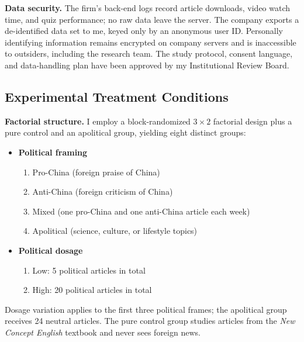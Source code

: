 \documentclass[12pt, american]{article}
\begin{document}
\textbf{Data security.}
The firm’s back-end logs record article downloads, video watch time, and quiz performance; no raw data leave the server.  The company exports a de-identified data set to me, keyed only by an anonymous user ID.  Personally identifying information remains encrypted on company servers and is inaccessible to outsiders, including the research team.  The study protocol, consent language, and data-handling plan have been approved by my Institutional Review Board.

\subsection{Experimental Treatment Conditions}

\textbf{Factorial structure.}
I employ a block-randomized $3 \times 2$ factorial design plus a pure control and an apolitical group, yielding eight distinct groups:

\begin{itemize}
    \item \textbf{Political framing}  
          \begin{enumerate}
              \item Pro-China (foreign praise of China)  
              \item Anti-China (foreign criticism of China)  
              \item Mixed (one pro-China and one anti-China article each week)  
              \item Apolitical (science, culture, or lifestyle topics)
          \end{enumerate}
    \item \textbf{Political dosage}  
          \begin{enumerate}
              \item Low: 5 political articles in total  
              \item High: 20 political articles in total
          \end{enumerate}
\end{itemize}

Dosage variation applies to the first three political frames; the apolitical group receives 24 neutral articles.  The pure control group studies articles from the \textit{New Concept English} textbook and never sees foreign news.
\end{document}

